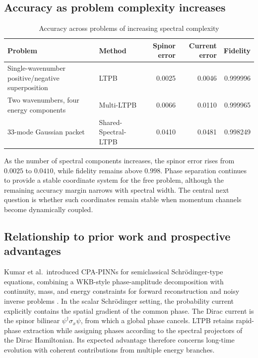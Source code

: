 \documentclass[a4paper,11pt]{article}
\begin{document}
\subsection{Accuracy as problem complexity increases}

\begin{table}[htbp]
\centering
\small
\caption{Accuracy across problems of increasing spectral complexity}
\begin{tabularx}{\textwidth}{@{}Y Y r r r@{}}
\toprule
Problem & Method & Spinor error & Current error & Fidelity \\
\midrule
Single-wavenumber positive/negative superposition & LTPB &
0.0025 & 0.0046 & 0.999996 \\
Two wavenumbers, four energy components & Multi-LTPB &
0.0066 & 0.0110 & 0.999965 \\
33-mode Gaussian packet & Shared-Spectral-LTPB &
0.0410 & 0.0481 & 0.998249 \\
\bottomrule
\end{tabularx}
\end{table}

As the number of spectral components increases, the spinor error rises from
\(0.0025\) to \(0.0410\), while fidelity remains above \(0.998\). Phase
separation continues to provide a stable coordinate system for the free
problem, although the remaining accuracy margin narrows with spectral width.
The central next question is whether such coordinates remain stable when
momentum channels become dynamically coupled.

\subsection{Relationship to prior work and prospective advantages}

Kumar et al.\ introduced CPA-PINNs for semiclassical Schr\"odinger-type
equations, combining a WKB-style phase-amplitude decomposition with continuity,
mass, and energy constraints for forward reconstruction and noisy inverse
problems \cite{kumar2026}. In the scalar Schr\"odinger setting, the probability
current explicitly contains the spatial gradient of the common phase. The
Dirac current is the spinor bilinear
\(\psi^\dagger\sigma_x\psi\), from which a global phase cancels. LTPB retains
rapid-phase extraction while assigning phases according to the spectral
projectors of the Dirac Hamiltonian. Its expected advantage therefore concerns
long-time evolution with coherent contributions from multiple energy branches.
\end{document}
